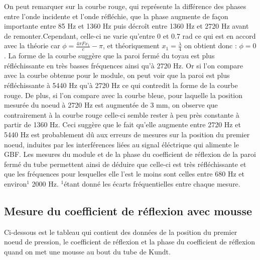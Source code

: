 \documentclass[a4paper,11pt]{article}
\begin{document}
On peut remarquer sur la courbe rouge, qui représente la différence des phases entre l'onde incidente et l'onde réfléchie, que la phase augmente de façon importante entre 85 Hz et 1360 Hz puis décroît entre 1360 Hz et 2720 Hz avant de remonter.Cependant, celle-ci ne varie qu'entre 0 et 0.7 rad ce qui est en accord avec la théorie car $\phi = \frac{4\pi F x_{1}}{c} - \pi$, et théoriquement $x_{1} = \frac{\lambda}{4}$ on obtient donc : $\phi = 0$. 
\newline
La forme de la courbe suggère que la paroi fermé du toyau est plus réfléchissante en très basses fréquences ainsi qu'à 2720 Hz. Or si l'on compare avec la courbe obtenue pour le module, on peut voir que la paroi est plus réfléchissante à 5440 Hz qu'à 2720 Hz ce qui contredit la forme de la courbe rouge.
\newline
De plus, si l'on compare avec la courbe bleue, pour laquelle la position mesurée du noeud à 2720 Hz est augmentée de 3 mm, on observe que contrairement à la courbe rouge celle-ci semble rester à peu près constante à partir de 1360 Hz.
Ceci suggère que le fait qu'elle augmente entre 2720 Hz et 5440 Hz est probablement dû aux erreurs de mesures sur la position du premier noeud, induites par les interférences liées au signal éléctrique qui alimente le GBF.
\newline
\newline
\newline
\newline
\newline
Les mesures du module et de la phase du coefficient de réflexion de la paroi fermé du tube permettent ainsi de déduire que celle-ci est très réfléchissante et que les fréquences pour lesquelles elle l'est le moins sont celles entre 680 Hz et environ$^1$ 2000 Hz.
\newline
$^1$étant donné les écarts fréquentielles entre chaque mesure.
\newline
\newline


\subsection{Mesure du coefficient de réflexion avec mousse}

Ci-dessous est le tableau qui contient des données de la position du premier noeud de pression, le coefficient de réflexion et la phase du coefficient de réflexion quand on met une mousse au bout du tube de Kundt.
\end{document}
